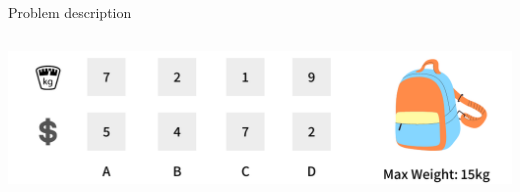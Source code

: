 \documentclass[aspectratio=169]{beamer}
\begin{document}
\begin{frame}{Problem description}
{\begin{columns}
            \begin{column}{0.45\textwidth}
                \begin{center}
                    \includegraphics[scale=0.15]{img/knapsack.png}
                \end{center}
            \end{column}
        \end{columns}
    }

\end{frame}
\end{document}
